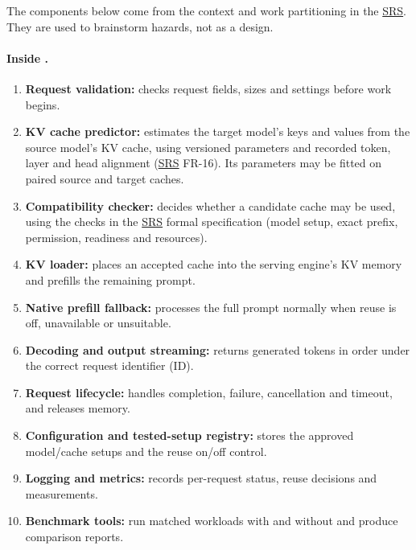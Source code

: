\documentclass{article}
\newcommand{\srs}{\href{../SRS-Volere/SRS.pdf}{SRS}}
\begin{document}
The components below come from the context and work partitioning in the
\srs{}. They are used to brainstorm hazards, not as a design.

\paragraph{Inside \progname{}.}
\begin{enumerate}[label=C\arabic*., ref=C\arabic*]
  \item \label{comp:validate} \textbf{Request validation:} checks request
  fields, sizes and settings before work begins.
  \item \label{comp:predict} \textbf{KV cache predictor:} estimates the
  target model's keys and values from the source model's KV cache, using
  versioned parameters and recorded token, layer and head alignment
  (\srs{} FR-16). Its parameters may be fitted on paired source and target
  caches.
  \item \label{comp:check} \textbf{Compatibility checker:} decides whether a
  candidate cache may be used, using the checks in the \srs{} formal
  specification (model setup, exact prefix, permission, readiness and
  resources).
  \item \label{comp:load} \textbf{KV loader:} places an accepted cache into
  the serving engine's KV memory and prefills the remaining prompt.
  \item \label{comp:native} \textbf{Native prefill fallback:} processes the
  full prompt normally when reuse is off, unavailable or unsuitable.
  \item \label{comp:output} \textbf{Decoding and output streaming:} returns
  generated tokens in order under the correct request identifier (ID).
  \item \label{comp:life} \textbf{Request lifecycle:} handles completion,
  failure, cancellation and timeout, and releases memory.
  \item \label{comp:config} \textbf{Configuration and tested-setup
  registry:} stores the approved model/cache setups and the reuse on/off
  control.
  \item \label{comp:log} \textbf{Logging and metrics:} records per-request
  status, reuse decisions and measurements.
  \item \label{comp:bench} \textbf{Benchmark tools:} run matched workloads
  with and without \progname{} and produce comparison reports.
\end{enumerate}
\end{document}
